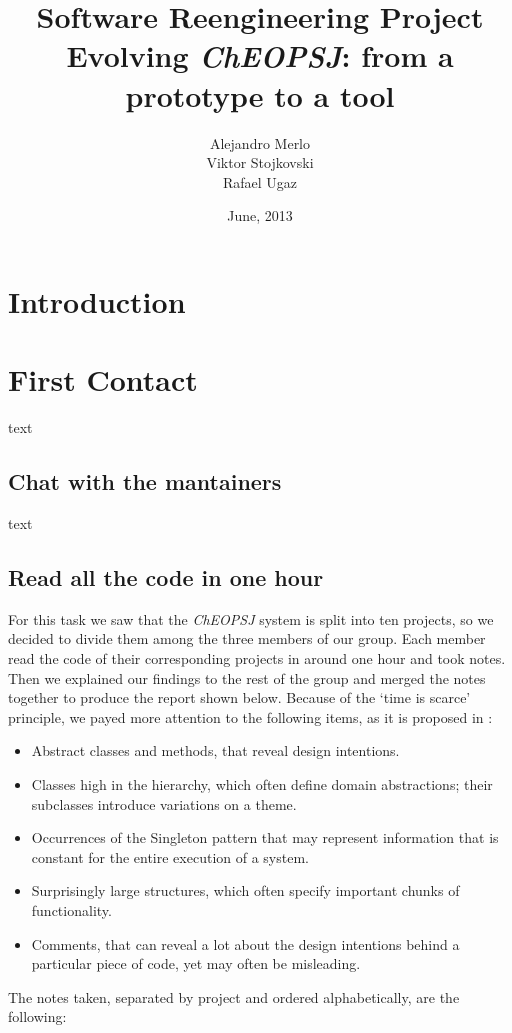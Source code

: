 \documentclass{article}
\title{Software Reengineering Project \\ Evolving \emph{ChEOPSJ}: from a prototype to a tool}
\author{Alejandro Merlo\\ Viktor Stojkovski\\ Rafael Ugaz}
\date{June, 2013}
\begin{document}
\maketitle

\section{Introduction}

\section{First Contact}

text

\subsection{Chat with the mantainers}
text

\subsection{Read all the code in one hour}
\label{sec:codeOneHour}
For this task we saw that the \emph{ChEOPSJ} system is split into ten projects, so we decided to divide them among the three members of our group. Each member read the code of their corresponding projects in around one hour and took notes. Then we explained our findings to the rest of the group and merged the notes together to produce the report shown below. Because of the `time is scarce' principle, we payed more attention to the following items, as it is proposed in \cite{demeyer02}:
\begin{itemize}
\item Abstract classes and methods, that reveal design intentions.
\item Classes high in the hierarchy, which often define domain abstractions; their subclasses introduce variations on a theme.
\item Occurrences of the Singleton pattern that may represent information that is constant for the entire execution of a system.
\item Surprisingly large structures, which often specify important chunks of functionality.
\item Comments, that can reveal a lot about the design intentions behind a particular piece of code, yet may often be misleading.
\end{itemize}

The notes taken, separated by project and ordered alphabetically, are the following:
\end{document}
